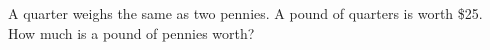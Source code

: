 A quarter weighs the same as two pennies. A pound of quarters is worth \$25. How much is a pound of pennies worth?
